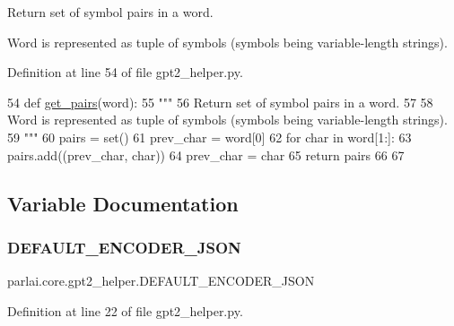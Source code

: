\begin{DoxyVerb}Return set of symbol pairs in a word.

Word is represented as tuple of symbols (symbols being variable-length strings).
\end{DoxyVerb}
 

Definition at line 54 of file gpt2\+\_\+helper.\+py.


\begin{DoxyCode}
54 \textcolor{keyword}{def }\hyperlink{namespaceparlai_1_1core_1_1gpt2__helper_ac5bffa2aece99e43444185ba85dff425}{get\_pairs}(word):
55     \textcolor{stringliteral}{"""}
56 \textcolor{stringliteral}{    Return set of symbol pairs in a word.}
57 \textcolor{stringliteral}{}
58 \textcolor{stringliteral}{    Word is represented as tuple of symbols (symbols being variable-length strings).}
59 \textcolor{stringliteral}{    """}
60     pairs = set()
61     prev\_char = word[0]
62     \textcolor{keywordflow}{for} char \textcolor{keywordflow}{in} word[1:]:
63         pairs.add((prev\_char, char))
64         prev\_char = char
65     \textcolor{keywordflow}{return} pairs
66 
67 
\end{DoxyCode}


\subsection{Variable Documentation}
\mbox{\label{namespaceparlai_1_1core_1_1gpt2__helper_a39eb998ed915bcd1c86bafac1953a409}} 
\subsubsection{\texorpdfstring{D\+E\+F\+A\+U\+L\+T\+\_\+\+E\+N\+C\+O\+D\+E\+R\+\_\+\+J\+S\+ON}{DEFAULT\_ENCODER\_JSON}}
{\footnotesize\ttfamily parlai.\+core.\+gpt2\+\_\+helper.\+D\+E\+F\+A\+U\+L\+T\+\_\+\+E\+N\+C\+O\+D\+E\+R\+\_\+\+J\+S\+ON}



Definition at line 22 of file gpt2\+\_\+helper.\+py.

